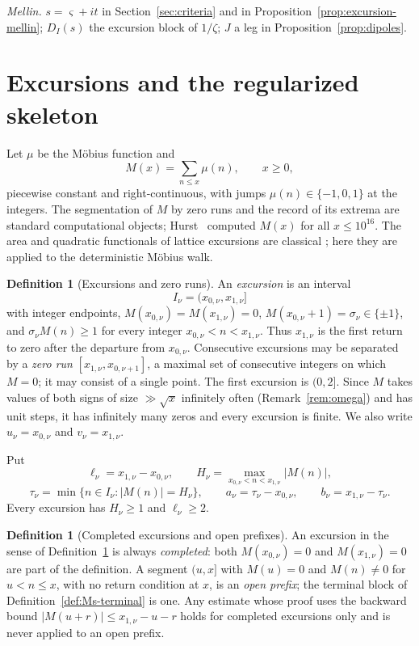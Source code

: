 \documentclass[11pt]{amsart}
\numberwithin{equation}{section}
\theoremstyle{plain}
\theoremstyle{definition}
\newtheorem{definition}[theorem]{Definition}
\theoremstyle{remark}
\begin{document}
\smallskip
\noindent\emph{Mellin.}
$s=\varsigma+it$ in Section~\ref{sec:criteria} and in
Proposition~\ref{prop:excursion-mellin}; $D_I(s)$ the excursion block of
$1/\zeta$; $J$ a leg in Proposition~\ref{prop:dipoles}.

\section{Excursions and the regularized skeleton}
\label{sec:definitions}

Let $\mu$ be the M\"obius function and
\begin{equation}
\label{eq:mertens_def}
M(x)=\sum_{n\le x}\mu(n),\qquad x\ge0,
\end{equation}
piecewise constant and right-continuous, with jumps $\mu(n)\in\{-1,0,1\}$
at the integers. The segmentation of $M$ by zero runs and the record of its
extrema are standard computational objects; Hurst~\cite{Hurst18} computed
$M(x)$ for all $x\le10^{16}$. The area and quadratic functionals of lattice
excursions are classical
\cite{Takacs91,NguyenThe04,Richard05,Janson07,DKW15,CP17}; here they are
applied to the deterministic M\"obius walk.

\begin{definition}[Excursions and zero runs]
\label{def:excursion}
An \emph{excursion} is an interval
\[
I_\nu=(x_{0,\nu},x_{1,\nu}]
\]
with integer endpoints, $M(x_{0,\nu})=M(x_{1,\nu})=0$,
$M(x_{0,\nu}+1)=\sigma_\nu\in\{\pm1\}$, and
$\sigma_\nu M(n)\ge1$ for every integer $x_{0,\nu}<n<x_{1,\nu}$. Thus
$x_{1,\nu}$ is the first return to zero after the departure from
$x_{0,\nu}$. Consecutive excursions may be separated by a \emph{zero run}
$[x_{1,\nu},x_{0,\nu+1}]$, a maximal set of consecutive integers on which
$M=0$; it may consist of a single point. The first excursion is $(0,2]$.
Since $M$ takes values of both signs of size $\gg\sqrt x$ infinitely often
(Remark~\ref{rem:omega}) and has unit steps, it has infinitely many zeros
and every excursion is finite. We also write $u_\nu=x_{0,\nu}$ and
$v_\nu=x_{1,\nu}$.

Put
\[
\ell_\nu=x_{1,\nu}-x_{0,\nu},\qquad
H_\nu=\max_{x_{0,\nu}<n<x_{1,\nu}}|M(n)|,
\]
\[
\tau_\nu=\min\{n\in I_\nu:|M(n)|=H_\nu\},\qquad
a_\nu=\tau_\nu-x_{0,\nu},\qquad b_\nu=x_{1,\nu}-\tau_\nu.
\]
Every excursion has $H_\nu\ge1$ and $\ell_\nu\ge2$.
\end{definition}

\begin{definition}[Completed excursions and open prefixes]
\label{def:completed-open}
An excursion in the sense of Definition~\ref{def:excursion} is always
\emph{completed}: both $M(x_{0,\nu})=0$ and $M(x_{1,\nu})=0$ are part of
the definition. A segment $(u,x]$ with $M(u)=0$ and $M(n)\ne0$ for
$u<n\le x$, with no return condition at $x$, is an \emph{open prefix}; the
terminal block of Definition~\ref{def:Ms-terminal} is one. Any estimate
whose proof uses the backward bound $|M(u+r)|\le x_{1,\nu}-u-r$ holds for
completed excursions only and is never applied to an open prefix.
\end{definition}
\end{document}
